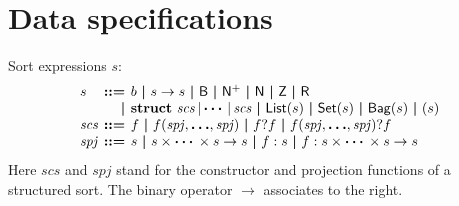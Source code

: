 \documentclass[a4paper,fleqn,10pt]{article}
\makeatletter
\newcommand{\f}[1]{\ensuremath{\mathit{#1}}}
\newcommand{\sbool}{\ensuremath{\mathsf{B}}}
\newcommand{\snat}{\ensuremath{\mathsf{N}}}
\newcommand{\spos}{\ensuremath{\snat^{+}}}
\newcommand{\sint}{\ensuremath{\mathsf{Z}}}
\newcommand{\sreal}{\ensuremath{\mathsf{R}}}
\newenvironment{tightarray}[1]
  {\setlength{\arraycolsep}{2pt}%
   \begin{array}{@{}#1@{}}%
  }
  {\end{array}%
  }
\newcommand{\mb}[1]{\text{\boldmath$#1$}}
\newcommand{\kwstruct}{{\bf struct}}
\makeatother
\begin{document}
\section{Data specifications}

Sort expressions $s$:
\[\begin{tightarray}{lrl}
s      & \mb{::=} & b\ \mb{|}\ s \to s\ \mb{|}\ 
               \sbool\ \mb{|}\ \spos\ \mb{|}\ \snat\ \mb{|}\ \sint\ \mb{|}\ \sreal\\
       & \mb{|}   &
               \kwstruct\ \f{scs}\,|\,\mb{\cdots}\,|\,\f{scs}\ \mb{|}\ 
               \mathsf{List}(s)\ \mb{|}\ \mathsf{Set}(s)\ \mb{|}\ \mathsf{Bag}(s)\ \mb{|}\ 
               ( s )\\
\f{scs} & \mb{::=} & f\ \mb{|}\ f(\f{spj},\mb{\ldots},\f{spj})\ \mb{|}\ 
                f ? f\ \mb{|}\ f(\f{spj},\mb{\ldots},\f{spj})?f \\
\f{spj} & \mb{::=} & s\ \mb{|}\ s \times \mb{\cdots} \times s \to s\ \mb{|}\ 
                f: s\ \mb{|}\ f: s \times \mb{\cdots} \times s \to s
\end{tightarray}\]
Here $\f{scs}$ and $\f{spj}$ stand for the constructor and projection functions of a structured sort.
The binary operator $\to$ associates to the right.
\end{document}
